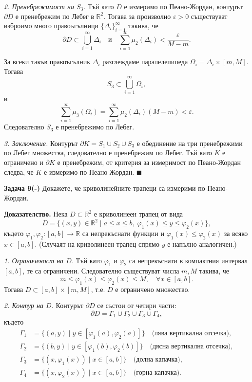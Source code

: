 \documentclass[10pt]{article}
\begin{document}
\textit{2. Пренебрежимост на $S_3$.} 
Тъй като $D$ е измеримо по Пеано-Жордан, контурът $\partial D$ е пренебрежим по Лебег в $\mathbb{R}^2$. Тогава за произволно $\varepsilon > 0$ съществуват изброимо много правоъгълници $\{\Delta_i\}_{i=1}^\infty$ такива, че
\[
\partial D \subset \bigcup_{i=1}^\infty \Delta_i \quad \text{и} \quad \sum_{i=1}^\infty \mu_2(\Delta_i) < \frac{\varepsilon}{M-m}.
\]

За всеки такъв правоъгълник $\Delta_i$ разглеждаме паралелепипеда $\Omega_i = \Delta_i \times [m,M]$. Тогава
\[
S_3 \subset \bigcup_{i=1}^\infty \Omega_i,
\]
и
\[
\sum_{i=1}^\infty \mu_3(\Omega_i) = \sum_{i=1}^\infty \mu_2(\Delta_i)(M-m) < \varepsilon.
\]
Следователно $S_3$ е пренебрежимо по Лебег.

\textit{3. Заключение.} 
Контурът $\partial K = S_1 \cup S_2 \cup S_3$ е обединение на три пренебрежими по Лебег множества, следователно е пренебрежим по Лебег. Тъй като $K$ е ограничено и $\partial K$ е пренебрежим, от критерия за измеримост по Пеано-Жордан следва, че $K$ е измеримо по Пеано-Жордан. $\blacksquare$


\textbf{Задача 9(-) }Докажете, че криволинейните трапеци са измерими по Пеано-Жордан. 

\textbf{Доказателство.} 
Нека $D \subset \mathbb{R}^2$ е криволинеен трапец от вида
\[
D = \{(x,y) \in \mathbb{R}^2 \mid a \le x \le b,\; \varphi_1(x) \le y \le \varphi_2(x)\},
\]
където $\varphi_1,\varphi_2 : [a,b] \to \mathbb{R}$ са непрекъснати функции и $\varphi_1(x) \le \varphi_2(x)$ за всяко $x \in [a,b]$. (Случаят на криволинеен трапец спрямо $y$ е напълно аналогичен.)

\textit{1. Ограниченост на $D$.} 
Тъй като $\varphi_1$ и $\varphi_2$ са непрекъснати в компактния интервал $[a,b]$, те са ограничени. Следователно съществуват числа $m,M$ такива, че
\[
m \le \varphi_1(x) \le \varphi_2(x) \le M, \quad \forall x \in [a,b].
\]
Тогава $D \subset [a,b] \times [m,M]$, т.е. $D$ е ограничено множество.

\textit{2. Контур на $D$.} 
Контурът $\partial D$ се състои от четири части:
\[
\partial D = \Gamma_1 \cup \Gamma_2 \cup \Gamma_3 \cup \Gamma_4,
\]
където
\begin{align*}
\Gamma_1 &= \{(a,y) \mid y \in [\varphi_1(a),\varphi_2(a)]\} \quad \text{(лява вертикална отсечка)},\\
\Gamma_2 &= \{(b,y) \mid y \in [\varphi_1(b),\varphi_2(b)]\} \quad \text{(дясна вертикална отсечка)},\\
\Gamma_3 &= \{(x,\varphi_1(x)) \mid x \in [a,b]\} \quad \text{(долна капачка)},\\
\Gamma_4 &= \{(x,\varphi_2(x)) \mid x \in [a,b]\} \quad \text{(горна капачка)}.
\end{align*}
\end{document}
